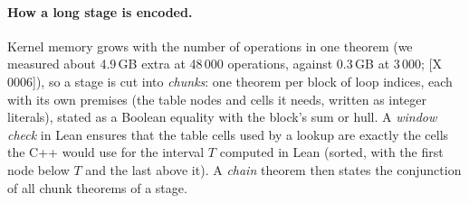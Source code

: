 \documentclass[10pt]{article}
\newcommand{\tg}[2]{\texorpdfstring{\textsf{[#1\,#2]}}{}}  %
\renewcommand{\_}{\textunderscore\allowbreak}
\begin{document}
\paragraph{How a long stage is encoded.} Kernel memory grows with the number of operations in one theorem (we measured about 4.9\,GB extra at 48\,000 operations, against 0.3\,GB at 3\,000; \tg{X}{0006}),
so a stage is cut into \emph{chunks}: one theorem per block of loop indices, each with its own premises (the table nodes and cells it needs, written as integer literals), stated as a Boolean equality with the
block's sum or hull. A \emph{window check} in Lean ensures that the table cells used by a lookup are exactly the cells the C++ would use for the interval $T$ computed in Lean (sorted, with the first node below
$T$ and the last above it). A \emph{chain} theorem then states the conjunction of all chunk theorems of a stage.
\end{document}

